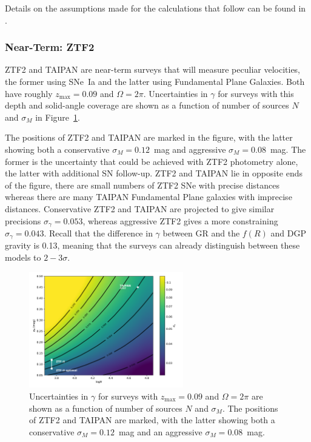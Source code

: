\documentclass[11pt, oneside]{article}   	%
\begin{document}
Details on the assumptions made for the calculations that follow can be found in \cite{2019BAAS...51c.140K}.

\subsubsection{Near-Term: ZTF2}
ZTF2 and TAIPAN are near-term surveys that will measure peculiar velocities, the former using SNe~Ia and the latter
using Fundamental Plane Galaxies.  Both have roughly
 $z_{\text{max}}=0.09$ and $\Omega = 2\pi$.
Uncertainties in $\gamma$ for surveys with this depth and solid-angle coverage 
are shown as a function of number of sources $N$ and $\sigma_M$ in Figure~\ref{surface:fig}. 

The positions of ZTF2 and TAIPAN are marked
in the figure, with the latter showing both  a conservative $\sigma_M=0.12$~mag and aggressive $\sigma_M=0.08$~mag.
The former is the uncertainty that could be achieved with ZTF2 photometry alone, the latter with additional
SN follow-up.
ZTF2 and TAIPAN lie in opposite ends of the figure, there are small numbers of ZTF2 SNe with precise distances
whereas there are many TAIPAN Fundamental Plane galaxies with imprecise distances. 
Conservative ZTF2 and TAIPAN
are projected to give similar precisions $\sigma_ \gamma = 0.053$, whereas  aggressive ZTF2 gives a more constraining
$\sigma_ \gamma = 0.043$.  
Recall that the difference in $\gamma$  between GR and the $f(R)$ and DGP gravity is 0.13, meaning that the surveys
can already distinguish between these models to $2-3 \sigma$.

\begin{figure}
\centering
\includegraphics[width=0.6\textwidth]{src/surface1.pdf}
\caption{Uncertainties in $\gamma$ for surveys  with $z_{\text{max}}=0.09$ and $\Omega = 2\pi$
are shown as a function of number of sources $N$ and $\sigma_M$.  The positions of ZTF2 and TAIPAN are marked,
with the latter showing both  a conservative $\sigma_M=0.12$~mag and an aggressive $\sigma_M=0.08$~mag.
\label{surface:fig}}
\end{figure}
\end{document}
